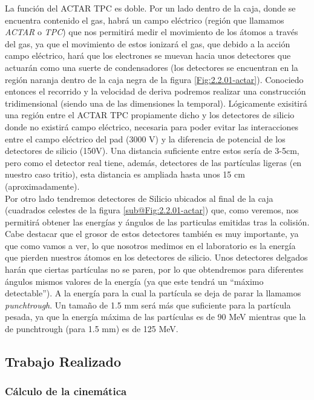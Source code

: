 \documentclass[12pt,a4paper]{article}
\numberwithin{equation}{section}
\numberwithin{figure}{section}
\begin{document}
La función del ACTAR TPC es doble. Por un lado dentro de la caja, donde se encuentra contenido el gas, habrá un campo eléctrico (región que llamamos {\it ACTAR} o {\it TPC}) que nos permitirá medir el movimiento de los átomos a través del gas, ya que  el movimiento de estos ionizará el gas, que debido a la acción campo eléctrico, hará que los electrones se muevan  hacia unos detectores que actuarán como una suerte de condensadores (los detectores se encuentran en la región naranja dentro de la caja negra de la figura \ref{Fig:2.2.01-actar}). Conociedo entonces el recorrido y la velocidad de deriva podremos realizar una construcción tridimensional (siendo una de las dimensiones la temporal). Lógicamente exisitirá una región entre el ACTAR TPC propiamente dicho y los detectores de silicio donde no existirá campo eléctrico, necesaria para poder evitar las interacciones entre el campo eléctrico del pad (3000 V) y la diferencia de potencial de los detectores de silicio (150V). Una distancia suficiente entre estos sería de 3-5cm, pero como el detector real tiene, además, detectores de las partículas ligeras (en nuestro caso tritio), esta distancia es ampliada hasta unos 15 cm (aproximadamente).  \\

Por otro lado tendremos detectores de Silicio ubicados al final de la caja (cuadrados celestes de la figura \ref{sub@Fig:2.2.01-actar}) que, como veremos, nos permitirá obtener las energías y ángulos de las particulas emitidas tras la colisión. Cabe destacar que el grosor de estos detectores también es muy importante, ya que como vamos a ver, lo que nosotros medimos en el laboratorio es la energía que pierden nuestros átomos en los detectores de silicio. Unos detectores delgados harán que ciertas partículas no se paren, por lo que obtendremos para diferentes ángulos mismos valores de la energía (ya que este tendrá un ``máximo detectable''). A la energía para la cual la partícula se deja de parar la llamamos {\it punchtrough}. Un tamaño de 1.5 mm será más que suficiente para la partícula pesada, ya que la energía máxima de las partículas es de 90 MeV mientras que la de punchtrough (para 1.5 mm) es de 125 MeV.  


\subsection{Trabajo Realizado}

\subsubsection{Cálculo de la cinemática}
\end{document}
